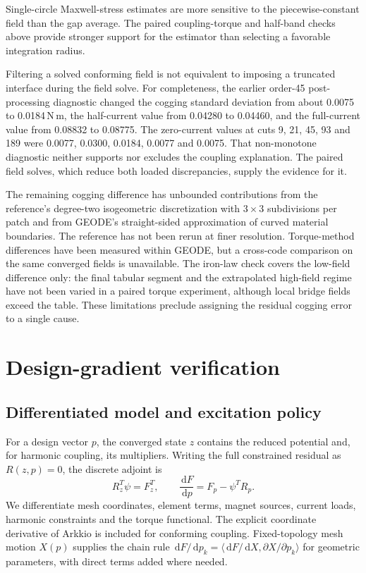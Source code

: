 \documentclass{anvil-paper}
\newcommand{\dd}{\,\mathrm{d}}
\begin{document}
Single-circle Maxwell-stress estimates are more sensitive to the
piecewise-constant field than the gap average. The paired coupling-torque
and half-band checks above provide stronger support for the estimator
than selecting a favorable integration radius.

Filtering a solved conforming field is not equivalent to imposing a
truncated interface during the field solve. For completeness, the earlier
order-45 post-processing diagnostic changed the cogging standard deviation
from about 0.0075 to 0.0184\,N\,m, the half-current value from 0.04280 to
0.04460, and the full-current value from 0.08832 to 0.08775. The zero-current
values at cuts 9, 21, 45, 93 and 189 were 0.0077, 0.0300, 0.0184, 0.0077
and 0.0075. That non-monotone diagnostic neither supports nor excludes the
coupling explanation. The paired field solves, which reduce both loaded
discrepancies, supply the evidence for it.

The remaining cogging difference has unbounded contributions from the
reference's degree-two isogeometric discretization with $3\times3$
subdivisions per patch and from GEODE's straight-sided approximation of
curved material boundaries. The reference has not been rerun at finer
resolution. Torque-method differences have been measured within GEODE,
but a cross-code comparison on the same converged fields is unavailable.
The iron-law check covers the low-field difference only: the final tabular
segment and the extrapolated high-field regime have not been varied in a
paired torque experiment, although local bridge fields exceed the table.
These limitations preclude assigning the residual cogging error to a
single cause.

\section{Design-gradient verification}\label{sec:gradients}
\subsection{Differentiated model and excitation policy}
For a design vector $p$, the converged state $z$ contains the reduced
potential and, for harmonic coupling, its multipliers. Writing the full
constrained residual as $R(z,p)=0$, the discrete adjoint is
\begin{equation}
 R_z^T\psi=F_z^T,\qquad
 \frac{\dd F}{\dd p}=F_p-\psi^T R_p.
 \label{eq:adjoint}
\end{equation}
We differentiate mesh coordinates, element terms, magnet sources, current
loads, harmonic constraints and the torque functional. The explicit
coordinate derivative of Arkkio is included for conforming coupling.
Fixed-topology mesh motion $X(p)$ supplies the chain rule
$\dd F/\dd p_k=\langle\dd F/\dd X,\partial X/\partial p_k\rangle$
for geometric parameters, with direct terms added where needed.
\end{document}
